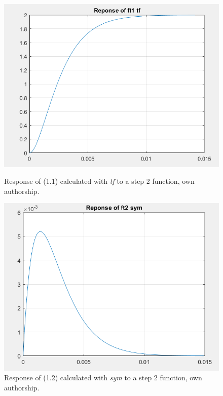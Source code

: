 \documentclass[a4paper,12pt]{article}
\begin{document}
\begin{figure}[H]
    \centering
    \begin{minipage}[b]{0.40\linewidth}
        \centering
        \includegraphics[width=\linewidth]{tf1 response.png}
        \caption{Response of (1.1) calculated with \textit{tf} to a step 2 function, own authorship.}
        \label{fig:tf1-response}
    \end{minipage}
    \hspace{0.05\linewidth} %
    \begin{minipage}[b]{0.40\linewidth}
        \centering
        \includegraphics[width=\linewidth]{sym2 response.png}
        \caption{Response of (1.2) calculated with \textit{sym} to a step 2 function, own authorship.}
        \label{fig:sym2-response}
    \end{minipage}
\end{figure}
\end{document}
